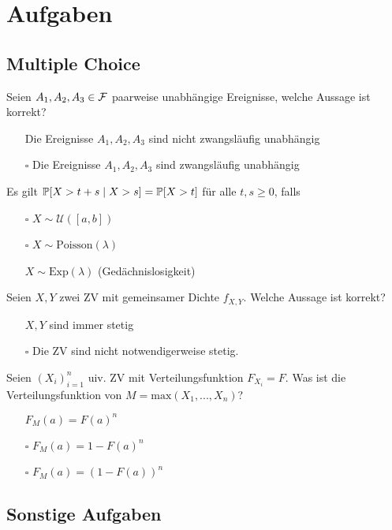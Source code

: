 \section*{Aufgaben}


\subsection{Multiple Choice}

Seien $A_1, A_2, A_3 \in \mathcal{F}$ paarweise unabhängige Ereignisse, welche Aussage ist korrekt?
\begin{itemize}
	\item[\marked] Die Ereignisse $A_1, A_2, A_3$ sind nicht zwangsläufig unabhängig
	\item[$\square$] Die Ereignisse $A_1, A_2, A_3$ sind zwangsläufig unabhängig
\end{itemize}

\hrulefill

Es gilt $\mathbb{P}[X > t + s \; | \; X > s] = \mathbb{P}[X > t]$ für alle $t,s \geq 0$, falls
\begin{itemize}
	\item[$\square$] $X \sim \mathcal{U}([a,b])$
	\item[$\square$] $X \sim \text{Poisson}(\lambda)$
	\item[\marked] $X \sim \text{Exp}(\lambda)$ (Gedächnislosigkeit)
\end{itemize}

\hrulefill

Seien $X,Y$ zwei ZV mit gemeinsamer Dichte $f_{X,Y}$. Welche Aussage ist korrekt?
\begin{itemize}
	\item[\marked] $X,Y$ sind immer stetig
	\item[$\square$] Die ZV sind nicht notwendigerweise stetig.
\end{itemize}

\hrulefill

Seien $(X_i)_{i = 1}^n$ uiv. ZV mit Verteilungsfunktion $F_{X_i} = F$. Was ist die Verteilungsfunktion von $M = \text{max}(X_1,...,X_n)$?
\begin{itemize}
	\item[\marked] $F_M(a) = F(a)^n$
	\item[$\square$] $F_M(a) = 1 - F(a)^n$
	\item[$\square$] $F_M(a) = (1 - F(a))^n$
\end{itemize}

\subsection{Sonstige Aufgaben}

